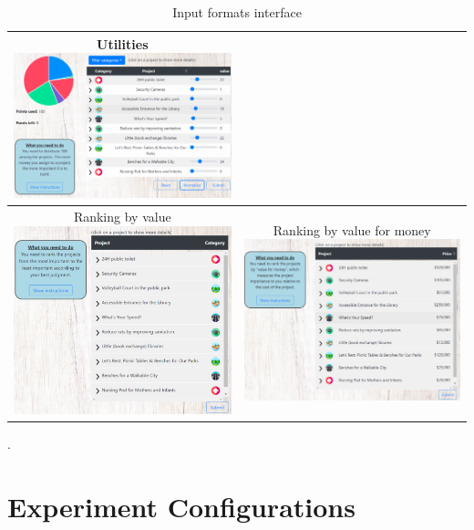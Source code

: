 \documentclass[10pt]{article}
\begin{document}
\begin{appendices}
\begin{table}[ht!]
\begin{center}
\begin{tabular}{|c|c|}
    \makecell{Utilities \\ \includegraphics[width=7.5cm]{experiment/utilities.PNG}}\\
    \hline
    \makecell{Ranking by value \\ \includegraphics[width=7cm]{experiment/ranking.PNG}} &
    \makecell{Ranking by value for money \\ \includegraphics[width=7.5cm]{experiment/ranking by cost.PNG}}\\

        
     \hline
    \end{tabular}
  \caption{Input formats interface}\label{tab:all_interfaces}.
  \end{center}
\end{table}

\section{Experiment Configurations}\label{app:elections}


\end{appendices}
\end{document}
